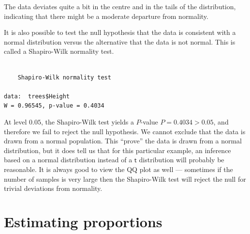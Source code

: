 \documentclass[
  a4paper,
  DIV=11,
  numbers=noendperiod,
  oneside]{scrreprt}
\newenvironment{Shaded}{\begin{snugshade}}{\end{snugshade}}
\newcommand{\FunctionTok}[1]{\textcolor[rgb]{0.28,0.35,0.67}{#1}}
\newcommand{\NormalTok}[1]{\textcolor[rgb]{0.00,0.23,0.31}{#1}}
\newcommand{\SpecialCharTok}[1]{\textcolor[rgb]{0.37,0.37,0.37}{#1}}
\theoremstyle{definition}
\theoremstyle{definition}
\theoremstyle{plain}
\theoremstyle{plain}
\theoremstyle{definition}
\theoremstyle{remark}
\begin{document}
\begin{tcolorbox}
\begin{figure}[H]
\end{figure}%

The data deviates quite a bit in the centre and in the tails of the
distribution, indicating that there might be a moderate departure from
normality.

It is also possible to test the null hypothesis that the data is
consistent with a normal distribution versus the alternative that the
data is not normal. This is called a Shapiro-Wilk normality test.

\begin{Shaded}
\end{Shaded}

\begin{verbatim}

    Shapiro-Wilk normality test

data:  trees$Height
W = 0.96545, p-value = 0.4034
\end{verbatim}

At level \(0.05\), the Shapiro-Wilk test yields a \(P\)-value
\(P = 0.4034 > 0.05\), and therefore we fail to reject the null
hypothesis. We cannot exclude that the data is drawn from a normal
population. This ``prove'' the data is drawn from a normal distribution,
but it does tell us that for this particular example, an inference based
on a normal distribution instead of a \(\mathsf{t}\) distribution will
probably be reasonable. It is always good to view the QQ plot as well
--- sometimes if the number of samples is very large then the
Shapiro-Wilk test will reject the null for trivial deviations from
normality.

\end{tcolorbox}

\section{Estimating proportions}\label{sec-estimating-proportions}
\end{document}
